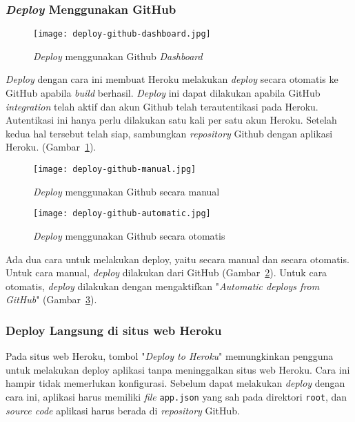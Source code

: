 \subsubsection{\textit{Deploy} Menggunakan GitHub}
\begin{figure}[H]
	\centering  
	\texttt{[image: deploy-github-dashboard.jpg]}  
	\caption[\textit{Deploy} menggunakan Github \textit{Dashboard}]{\textit{Deploy} menggunakan Github \textit{Dashboard}} 
	\label{fig:deploy-github-dashboard} 
\end{figure}
\textit{Deploy} dengan cara ini membuat Heroku melakukan \textit{deploy} secara otomatis ke GitHub apabila \textit{build} berhasil. \textit{Deploy} ini dapat dilakukan apabila GitHub \textit{integration} telah aktif dan akun Github telah terautentikasi pada Heroku. Autentikasi ini hanya perlu dilakukan satu kali per satu akun Heroku. Setelah kedua hal tersebut telah siap, sambungkan \textit{repository} Github dengan aplikasi Heroku. (Gambar~\ref{fig:deploy-github-dashboard}).

\begin{figure}[H]
	\centering  
	\texttt{[image: deploy-github-manual.jpg]}  
	\caption[\textit{Deploy} menggunakan Github secara manual]{\textit{Deploy} menggunakan Github secara manual} 
	\label{fig:deploy-github-manual} 
\end{figure}
\begin{figure}[H]
	\centering  
	\texttt{[image: deploy-github-automatic.jpg]}  
	\caption[\textit{Deploy} menggunakan Github secara otomatis]{\textit{Deploy} menggunakan Github secara otomatis} 
	\label{fig:deploy-github-automatic} 
\end{figure}
Ada dua cara untuk melakukan deploy, yaitu secara manual dan secara otomatis. Untuk cara manual, \textit{deploy} dilakukan dari GitHub (Gambar~\ref{fig:deploy-github-manual}). Untuk cara otomatis, \textit{deploy} dilakukan dengan mengaktifkan "\textit{Automatic deploys from GitHub}" (Gambar~\ref{fig:deploy-github-automatic}).

\subsubsection{Deploy Langsung di situs web Heroku}
Pada situs web Heroku, tombol "\textit{Deploy to Heroku}" memungkinkan pengguna untuk melakukan deploy aplikasi tanpa meninggalkan situs web Heroku. Cara ini hampir tidak memerlukan konfigurasi. Sebelum dapat melakukan \textit{deploy} dengan cara ini, aplikasi harus memiliki \textit{file} \texttt{app.json} yang sah pada direktori \texttt{root}, dan \textit{source code} aplikasi harus berada di \textit{repository} GitHub.

